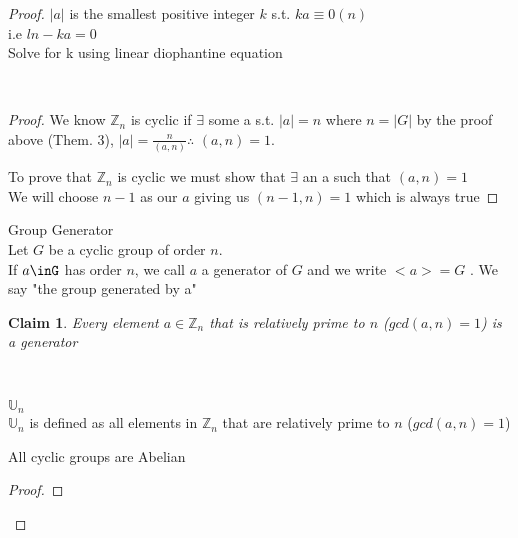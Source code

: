 \documentclass{article}
\newcounter{claim}
\theoremstyle{claim}
\newtheorem{claim}{Claim}[section]
\begin{document}
\begin{theorem}{Let a $\in  \mathbb{Z}_{n}$, then $|a| = \frac{n}{(a,n)}$\end{theorem}

\begin{proof}{$|a|$ is the smallest positive integer $k$ s.t. $ka  \equiv 0 (n)$\\i.e $ln-ka = 0$\\Solve for k using linear diophantine equation}

\\

\begin{proof}{

We know  $\mathbb{Z}_{n}$ is cyclic if $\exists$ some a s.t. $|a| = n$ where $n = |G|$ by the proof above (Them. 3), $|a| = \frac{n}{(a,n)}$$\therefore$ $(a, n) = 1$. 

To prove that $\mathbb{Z}_{n}$ is cyclic we must show that $\exists$ an a such that $(a, n) = 1$\\We will choose $n-1$ as our $a$ giving us $(n-1, n) = 1$ which is always true}

\end{proof}

\begin{definition}{Group Generator}\\
Let $G$ be a cyclic group of order $n$.\\
If $a\inG$ has order $n$, we call $a$ a generator of $G$ and we write $<a> = G$ . We say "the group generated by a"
\end{definition}

\begin{claim}{
Every element $a \in \mathbb{Z}_{n}$ that is relatively prime to $n$ ($gcd(a, n) = 1$) is a generator} 
\end{claim}\\

\begin{definition}{$\mathbb{U}_{n}$}\\
$\mathbb{U}_{n}$ is defined as all elements in $\mathbb{Z}_{n}$ that are relatively prime to $n$ ($gcd(a, n) = 1$)
\end{definition}

\begin{theorem}{All cyclic groups are Abelian}\end{theorem}
\begin{proof}{

}
\end{proof}
\end{proof}
\end{document}
